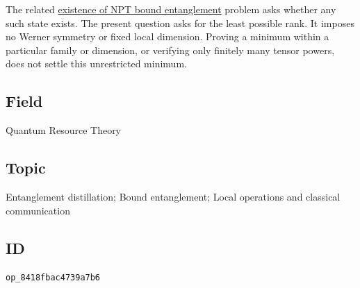 The related \href{https://qiqc-op.com/problem/op_74c4ffb5b042baf2/}{existence
of NPT bound entanglement} problem asks whether any such state exists.
The present question asks for the least possible rank. It imposes no
Werner symmetry or fixed local dimension. Proving a minimum within a
particular family or dimension, or verifying only finitely many tensor
powers, does not settle this unrestricted minimum.

\subsection*{Field}

Quantum Resource Theory

\subsection*{Topic}

Entanglement distillation; Bound entanglement; Local operations and classical communication

\subsection*{ID}

\texttt{op\_8418fbac4739a7b6}
